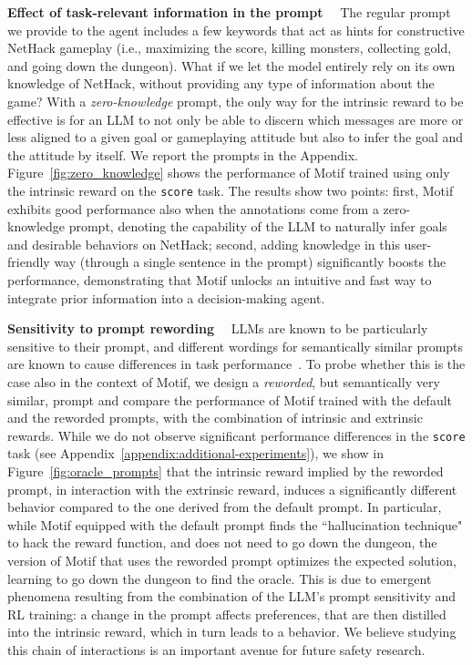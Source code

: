 \documentclass{article} %
\begin{document}
\textbf{Effect of task-relevant information in the prompt}~~
The regular prompt we provide to the agent includes a few keywords that act as hints for constructive NetHack gameplay (i.e., maximizing the score, killing monsters, collecting gold, and going down the dungeon).
What if we let the model entirely rely on its own knowledge of NetHack, without providing any type of information about the game?
With a \emph{zero-knowledge} prompt, the only way for the intrinsic reward to be effective is for an LLM 
to not only be able to discern which messages are more or less aligned to a given goal or gameplaying attitude but also to infer the goal and the attitude by itself.
We report the prompts in the Appendix.
Figure~\ref{fig:zero_knowledge} shows the performance of Motif trained using only the intrinsic reward on the \texttt{score} task. 
The results show two points: first, Motif exhibits good performance also when the annotations come from a zero-knowledge prompt, denoting the capability of the LLM to naturally infer goals and desirable behaviors on NetHack; second, adding knowledge in this user-friendly way (through a single sentence in the prompt) significantly boosts the performance, demonstrating that Motif unlocks an intuitive and fast way to integrate prior information into a decision-making agent.

\textbf{Sensitivity to prompt rewording}~~
LLMs are known to be particularly sensitive to their prompt, and different wordings for semantically similar prompts are known to cause differences in task performance~\citep{lu2022fantastically}.
To probe whether this is the case also in the context of Motif, we design a \emph{reworded}, but semantically very similar, prompt and compare the performance of Motif trained with the default and the reworded prompts, with the combination of intrinsic and extrinsic rewards.
While we do not observe significant performance differences in the \texttt{score} task (see Appendix~\ref{appendix:additional-experiments}), we show in Figure~\ref{fig:oracle_prompts} that the intrinsic reward implied by the reworded prompt, in interaction with the extrinsic reward, induces a significantly different behavior compared to the one derived from the default prompt.
In particular, while Motif equipped with the default prompt finds the ``hallucination technique" to hack the reward function, and does not need to go down the dungeon, the version of Motif that uses the reworded prompt optimizes the expected solution, learning to go down the dungeon to find the oracle.
This is due to emergent phenomena resulting from the combination of the LLM's prompt sensitivity and RL training: a change in the prompt affects preferences, that are then distilled into the intrinsic reward, which in turn leads to a behavior. We believe studying this chain of interactions is an important avenue for future safety research.
\end{document}
